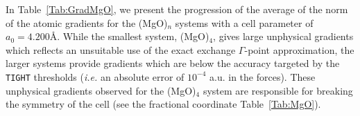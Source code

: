 \documentclass[prl,preprint,doublespace]{revtex4} %
\begin{document}
%
%
%
%
%
%
%
%
%
%
%
%
%
%
In Table~\ref{Tab:GradMgO}, we present the progression of the average of the norm of the
atomic gradients for the (MgO)$_n$ systems with a cell parameter of $a_0=4.200$\AA. 
While the smallest system, (MgO)$_4$, gives 
large unphysical gradients which reflects 
an unsuitable use of the exact exchange $\Gamma$-point approximation,
the larger systems provide gradients which are below the accuracy targeted by the 
{\tt TIGHT} thresholds ({\em i.e.} an absolute error of $10^{-4}$ a.u. in the forces).
These unphysical gradients observed for the (MgO)$_4$ system are responsible for
breaking the symmetry of the cell (see the fractional coordinate Table~\ref{Tab:MgO}).
\end{document}
